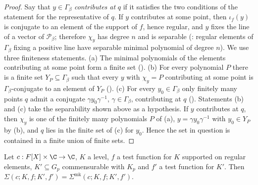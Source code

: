 \begin{proof}
Say that $y\in\Gamma_\beta$ \emph{contributes at} $q$ if it satisfies the two conditions of the statement for the representative of $q$. If $y$
contributes at some point, then $\iota_f(y)$ is conjugate to an element of the support of $f$, hence regular, and $y$ fixes the line of a vector of
$\mathcal P_\beta$; therefore $\chi_y$ has degree $n$ and is separable (: regular elements of
$\Gamma_\beta$ fixing a positive line have separable minimal polynomial of degree $n$). We use three finiteness statements.
(a) The minimal polynomials of the elements contributing at some point form a finite set
().
(b) For every polynomial $P$ there is a finite set $Y_P\subseteq\Gamma_\beta$ such that every $y$ with $\chi_y=P$ contributing at some point is
$\Gamma_\beta$-conjugate to an element of $Y_P$ ().
(c) For every $y_0\in\Gamma_\beta$ only finitely many points $q$ admit a conjugate $\gamma y_0\gamma^{-1}$, $\gamma\in\Gamma_\beta$, contributing at $q$
().
Statements (b) and (c) take the separability shown above as a hypothesis. If $y$ contributes at $q$, then $\chi_y$ is one of the finitely many
polynomials $P$ of (a), $y=\gamma y_0\gamma^{-1}$ with $y_0\in Y_P$ by (b), and $q$ lies in the finite set of (c) for $y_0$. Hence the set in question
is contained in a finite union of finite sets.
\end{proof}

\begin{proposition}\label{pf:ks1:prop-cxcount}
Let $c:F[X]\times\C\to\C$, $K$ a level, $f$ a test function for $K$ supported on regular elements, $K'\subseteq G_p$ commensurable
with $K_p$ and $f'$ a test function for $K'$. Then
$\Sigma(c;K,f;K',f')=\Sigma^{\mathrm{mk}}(c;K,f;K',f')$.
\end{proposition}

